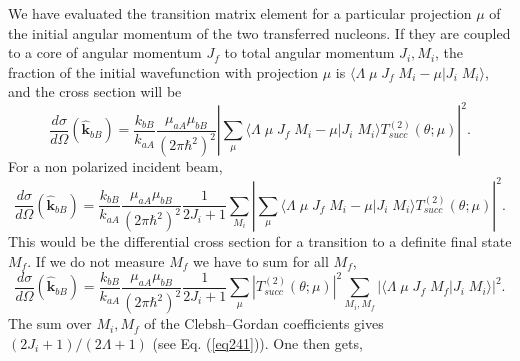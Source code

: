 We have evaluated the transition matrix element for a particular projection $\mu$ of the initial angular momentum of the two transferred nucleons. If they are coupled to a core of angular momentum $J_f$ to total angular momentum $J_i,M_i$, the fraction of the initial wavefunction with projection $\mu$ is $\langle \Lambda \;\mu\;J_f\;M_i-\mu|J_i\;M_i\rangle$, and the cross section will be
\begin{equation}\label{eq225_3}
\frac{d\sigma}{d\Omega}(\hat{\mathbf{k}}_{bB})=\frac{k_{bB}}{k_{aA}}\frac{\mu_{aA}\mu_{bB}}{(2\pi\hbar^2)^2}\left|\sum_\mu
\langle \Lambda \;\mu\;J_f\;M_i-\mu|J_i\;M_i\rangle T_{succ}^{(2)}(\theta;\mu)\right|^2.
\end{equation}
For a non polarized incident beam,
\begin{equation}\label{eq225_2}
\frac{d\sigma}{d\Omega}(\hat{\mathbf{k}}_{bB})=\frac{k_{bB}}{k_{aA}}\frac{\mu_{aA}\mu_{bB}}{(2\pi\hbar^2)^2}
\frac{1}{2J_i+1}\sum_{M_i}\left|\sum_{\mu}\langle \Lambda \;\mu\;J_f\;M_i-\mu|J_i\;M_i\rangle T_{succ}^{(2)}(\theta;\mu)\right|^2.
\end{equation}
This would be the differential cross section for a transition to a definite final state $M_f$. If we do not measure $M_f$ we have to sum for all  $M_f$,
\begin{equation}\label{eq225_4}
\frac{d\sigma}{d\Omega}(\hat{\mathbf{k}}_{bB})=\frac{k_{bB}}{k_{aA}}\frac{\mu_{aA}\mu_{bB}}{(2\pi\hbar^2)^2}
\frac{1}{2J_i+1}\sum_{\mu}|T_{succ}^{(2)}(\theta;\mu)|^2 \sum_{M_i,M_f}\left|\langle \Lambda \;\mu\;J_f\;M_f|J_i\;M_i\rangle\right|^2.
\end{equation}
The sum over $M_i,M_f$ of the Clebsh--Gordan coefficients gives $(2J_i+1)/(2\Lambda+1)$ (see Eq. (\ref{eq241})). One then gets,

